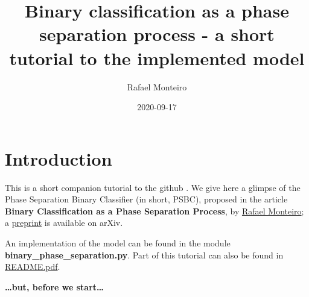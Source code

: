 \documentclass[openany,twoside]{book}
\title{Binary classification as a phase separation process - a short tutorial to the implemented model}
\author{Rafael Monteiro}
\date{2020-09-17}
\begin{document}
\maketitle

{
\setcounter{tocdepth}{1}
\tableofcontents
}
\hypertarget{intro}{%
\chapter{Introduction}\label{intro}}

This is a short companion tutorial to the github \citep{Bin_phase_github}. We give here a glimpse of the Phase Separation Binary Classifier (in short, PSBC), proposed in the article \textbf{Binary Classification as a Phase Separation Process}, by \href{https://sites.google.com/view/rafaelmonteiro-math/home}{Rafael Monteiro}; a \href{https://arxiv.org/abs/2009.02467}{preprint} is available on arXiv.

An implementation of the model can be found in the module \textbf{binary\_phase\_separation.py}. Part of this tutorial can also be found in \href{https://github.com/rafael-a-monteiro-math/Binary_classification_phase_separation/blob/master/README.pdf}{README.pdf}.

\textbf{\ldots but, before we start\ldots{}}
\end{document}
